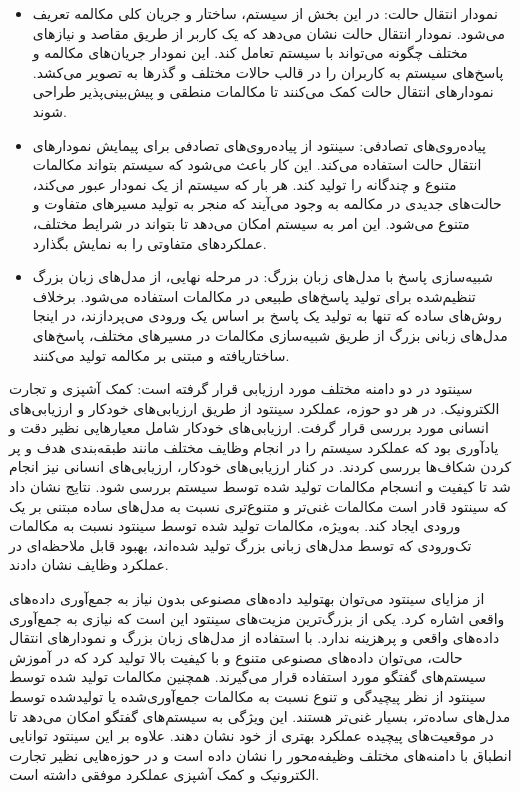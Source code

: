 \begin{enumerate}
\begin{itemize}
\item
نمودار انتقال حالت: در این بخش از سیستم، ساختار و جریان کلی مکالمه تعریف می‌شود. نمودار انتقال حالت نشان می‌دهد که یک کاربر از طریق مقاصد و نیازهای مختلف چگونه می‌تواند با سیستم تعامل کند. این نمودار جریان‌های مکالمه و پاسخ‌های سیستم به کاربران را در قالب حالات مختلف و گذرها به تصویر می‌کشد. نمودارهای انتقال حالت کمک می‌کنند تا مکالمات منطقی و پیش‌بینی‌پذیر طراحی شوند.
\item
پیاده‌روی‌های تصادفی: سینتود از پیاده‌روی‌های تصادفی برای پیمایش نمودارهای انتقال حالت استفاده می‌کند. این کار باعث می‌شود که سیستم بتواند مکالمات متنوع و چندگانه را تولید کند. هر بار که سیستم از یک نمودار عبور می‌کند، حالت‌های جدیدی در مکالمه به وجود می‌آیند که منجر به تولید مسیرهای متفاوت و متنوع می‌شود. این امر به سیستم امکان می‌دهد تا بتواند در شرایط مختلف، عملکردهای متفاوتی را به نمایش بگذارد.
\item
شبیه‌سازی پاسخ با مدل‌های زبان بزرگ: در مرحله نهایی، از مدل‌های زبان بزرگ تنظیم‌شده برای تولید پاسخ‌های طبیعی در مکالمات استفاده می‌شود. برخلاف روش‌های ساده که تنها به تولید یک پاسخ بر اساس یک ورودی می‌پردازند، در اینجا مدل‌های زبانی بزرگ از طریق شبیه‌سازی مکالمات در مسیرهای مختلف، پاسخ‌های ساختاریافته و مبتنی بر مکالمه تولید می‌کنند.
\end{itemize}

سینتود در دو دامنه مختلف مورد ارزیابی قرار گرفته است: کمک آشپزی و تجارت الکترونیک. در هر دو حوزه، عملکرد سینتود از طریق ارزیابی‌های خودکار و ارزیابی‌های انسانی مورد بررسی قرار گرفت. ارزیابی‌های خودکار شامل معیارهایی نظیر دقت و یادآوری بود که عملکرد سیستم را در انجام وظایف مختلف مانند طبقه‌بندی هدف و پر کردن شکاف‌ها بررسی کردند.
\newline
در کنار ارزیابی‌های خودکار، ارزیابی‌های انسانی نیز انجام شد تا کیفیت و انسجام مکالمات تولید شده توسط سیستم بررسی شود. نتایج نشان داد که سینتود قادر است مکالمات غنی‌تر و متنوع‌تری نسبت به مدل‌های ساده مبتنی بر یک ورودی ایجاد کند. به‌ویژه، مکالمات تولید شده توسط سینتود نسبت به مکالمات تک‌ورودی که توسط مدل‌های زبانی بزرگ تولید شده‌اند، بهبود قابل ملاحظه‌ای در عملکرد وظایف نشان دادند.

از مزایای سینتود می‌توان بهتولید داده‌های مصنوعی بدون نیاز به جمع‌آوری داده‌های واقعی اشاره کرد. 
یکی از بزرگ‌ترین مزیت‌های سینتود این است که نیازی به جمع‌آوری داده‌های واقعی و پرهزینه ندارد. با استفاده از مدل‌های زبان بزرگ و نمودارهای انتقال حالت، می‌توان داده‌های مصنوعی متنوع و با کیفیت بالا تولید کرد که در آموزش سیستم‌های گفتگو مورد استفاده قرار می‌گیرند.
\newline
همچنین مکالمات تولید شده توسط سینتود از نظر پیچیدگی و تنوع نسبت به مکالمات جمع‌آوری‌شده یا تولید‌شده توسط مدل‌های ساده‌تر، بسیار غنی‌تر هستند. این ویژگی به سیستم‌های گفتگو امکان می‌دهد تا در موقعیت‌های پیچیده عملکرد بهتری از خود نشان دهند.
علاوه بر این سینتود توانایی انطباق با دامنه‌های مختلف وظیفه‌محور را نشان داده است و در حوزه‌هایی نظیر تجارت الکترونیک و کمک آشپزی عملکرد موفقی داشته است.


\end{enumerate}
